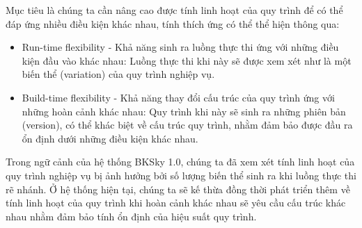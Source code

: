     Mục tiêu là chúng ta cần nâng cao được tính linh hoạt của quy trình để có thể đáp ứng nhiều điều kiện khác nhau, tính thích ứng có thể thể hiện thông qua:

    \begin{itemize}
        \item Run-time flexibility - Khả năng sinh ra luồng thực thi ứng với những điều kiện đầu vào khác nhau: Luồng thực thi khi này sẽ được xem xét như là một biến thể (variation) của quy trình nghiệp vụ.

        \item Build-time flexibility - Khả năng thay đổi cấu trúc của quy trình ứng với những hoàn cảnh khác nhau: Quy trình khi này sẽ sinh ra những phiên bản (version), có thể khác biệt về cấu trúc quy trình, nhằm đảm bảo được đầu ra ổn định dưới những điều kiện khác nhau.
    \end{itemize}

Trong ngữ cảnh của hệ thống BKSky 1.0, chúng ta đã xem xét tính linh hoạt của quy trình nghiệp vụ bị ảnh hưởng bởi số lượng biến thể sinh ra khi luồng thực thi rẽ nhánh. Ở hệ thống hiện tại, chúng ta sẽ kế thừa đồng thời phát triển thêm về tính linh hoạt của quy trình khi hoàn cảnh khác nhau sẽ yêu cầu cấu trúc khác nhau nhằm đảm bảo tính ổn định của hiệu suất quy trình.